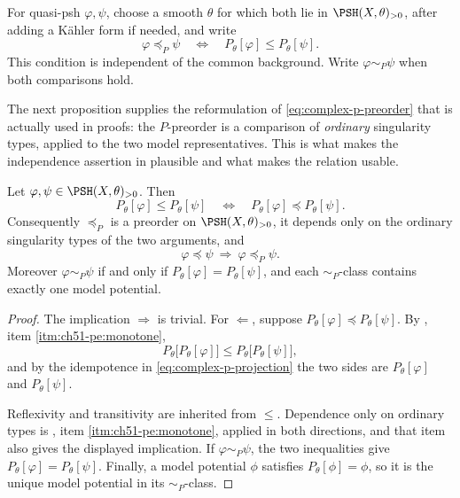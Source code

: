 \begin{definition}[\(P\)-preorder]
\label{def:complex-p-preorder}
For quasi-psh \(\varphi,\psi\), choose a smooth \(\theta\) for which both
lie in \(\PSH(X,\theta)_{>0}\), after adding a K\"ahler form if needed,
and write
\[
 \varphi\preceq_P\psi
 \quad\Longleftrightarrow\quad
 P_\theta[\varphi]\leq P_\theta[\psi].
\tag{51.25}\label{eq:complex-p-preorder}
\]
This condition is independent of the common background.  Write
\(\varphi\sim_P\psi\) when both comparisons hold.
\end{definition}

The next proposition supplies the reformulation of
\eqref{eq:complex-p-preorder} that is actually used in proofs: the
\(P\)-preorder is a comparison of \emph{ordinary} singularity types,
applied to the two model representatives.  This is what makes the
independence assertion in  plausible and
what makes the relation usable.

\begin{proposition}\label{prop:ch51-p-preorder-reformulation}
Let \(\varphi,\psi\in\PSH(X,\theta)_{>0}\).  Then
\[
 P_\theta[\varphi]\leq P_\theta[\psi]
 \quad\Longleftrightarrow\quad
 P_\theta[\varphi]\preceq P_\theta[\psi].
\]
Consequently \(\preceq_P\) is a preorder on
\(\PSH(X,\theta)_{>0}\), it depends only on the ordinary singularity
types of the two arguments, and
\[
 \varphi\preceq\psi\ \Longrightarrow\ \varphi\preceq_P\psi .
\]
Moreover \(\varphi\sim_P\psi\) if and only if
\(P_\theta[\varphi]=P_\theta[\psi]\), and each \(\sim_P\)-class contains
exactly one model potential.
\end{proposition}

\begin{proof}
The implication \(\Rightarrow\) is trivial.  For \(\Leftarrow\), suppose
\(P_\theta[\varphi]\preceq P_\theta[\psi]\).  By
, item \cref{itm:ch51-pe:monotone},
\[
 P_\theta\bigl[P_\theta[\varphi]\bigr]
 \leq
 P_\theta\bigl[P_\theta[\psi]\bigr],
\]
and by the idempotence in \eqref{eq:complex-p-projection} the two sides
are \(P_\theta[\varphi]\) and \(P_\theta[\psi]\).

Reflexivity and transitivity are inherited from \(\leq\).  Dependence
only on ordinary types is
, item \cref{itm:ch51-pe:monotone}, applied
in both directions, and that item also gives the displayed implication.
If \(\varphi\sim_P\psi\), the two inequalities give
\(P_\theta[\varphi]=P_\theta[\psi]\).  Finally, a model potential
\(\phi\) satisfies \(P_\theta[\phi]=\phi\), so it is the unique model
potential in its \(\sim_P\)-class.
\end{proof}

